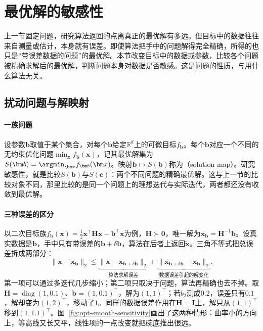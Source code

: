 \section{最优解的敏感性}
\label{sec:opt-smooth-sensitivity}

上一节固定问题，研究算法返回的点离真正的最优解有多远。但目标中的数据往往来自测量或估计，本身就有误差。即使算法把手中的问题解得完全精确，所得的也只是“带误差数据的问题”的最优解。本节改变目标中的数据或参数，比较各个问题被精确求解后的最优解，判断问题本身对数据是否敏感。这是问题的性质，与用什么算法无关。

\subsection{扰动问题与解映射}
\label{sec:opt-smooth-solution-map}

\paragraph{一族问题}
设参数$\bm b$取值于某个集合，对每个$\bm b$给定$\mathbb R^d$上的可微目标$f_{\bm b}$。每个$\bm b$对应一个不同的无约束优化问题$\min_{\bm x}f_{\bm b}(\bm x)$，记其最优解集为$S(\bm b)=\argmin_{\bm x}f_{\bm b}(\bm x)$。映射$\bm b\mapsto S(\bm b)$称为（solution map）。研究敏感性，就是比较$S(\bm b)$与$S(\bm c)$：两个不同问题的精确最优解。这与上一节的比较对象不同，那里比较的是同一个问题上的理想迭代与实际迭代，两者都还没有收敛到最优解。

\paragraph{三种误差的区分}
以二次目标族$f_{\bm b}(\bm x)=\tfrac12\bm x^\top\bm H\bm x-\bm b^\top\bm x$为例，$\bm H\succ\bm0$，唯一解为$\bm x_{\bm b}=\bm H^{-1}\bm b$。设真实数据是$\bm b$，手中只有带误差的$\bm b+\delta\bm b$，算法在后者上返回$\tilde{\bm x}$。三角不等式把总误差拆成两部分：
\[
  \lVert\tilde{\bm x}-\bm x_{\bm b}\rVert_2\leq\underbrace{\lVert\tilde{\bm x}-\bm x_{\bm b+\delta\bm b}\rVert_2}_{\text{算法求解误差}}+\underbrace{\lVert\bm x_{\bm b+\delta\bm b}-\bm x_{\bm b}\rVert_2}_{\text{数据误差引起的解变化}} .
\]
第一项可以通过多迭代几步缩小；第二项只取决于问题，算法再精确也去不掉。取$\bm H=\operatorname{diag}(1,0.1)$、$\bm b=(1,0.1)^\top$，解为$(1,1)^\top$；若$b_2$测成$0.2$，误差只有$0.1$，解却变为$(1,2)^\top$，移动了$1$。同样的数据误差作用在$\bm H=\bm I$上，解只从$(1,1)^\top$移到$(1,1.1)^\top$。图~\ref{fig:opt-smooth-sensitivity}画出了这两种情形：曲率小的方向上，等高线又长又平，线性项的一点改变就把碗底推出很远。

